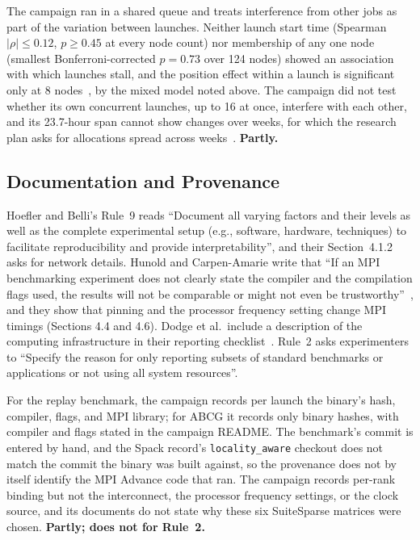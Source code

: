 \documentclass[11pt]{article}
\newcommand{\verdict}[1]{\textbf{#1}}
\begin{document}
The campaign ran in a shared queue and treats interference from other jobs as part of the
variation between launches. Neither launch start time (Spearman $|\rho| \le 0.12$,
$p \ge 0.45$ at every node count) nor membership of any one node (smallest
Bonferroni-corrected $p = 0.73$ over 124 nodes) showed an association with which launches
stall, and the position effect within a launch is significant only at 8
nodes~\cite{fivewayreport}, by the mixed model noted above. The campaign did not test
whether its own concurrent launches, up to 16 at once, interfere with each other, and its
23.7-hour span cannot show changes over weeks, for which the research plan asks for
allocations spread across weeks~\cite{researchplan}. \verdict{Partly.}

\subsection{Documentation and Provenance}

Hoefler and Belli's Rule~9 reads ``Document all varying factors and their levels as well
as the complete experimental setup (e.g., software, hardware, techniques) to facilitate
reproducibility and provide interpretability'', and their Section~4.1.2 asks for network
details. Hunold and Carpen-Amarie write that ``If an MPI benchmarking experiment does not
clearly state the compiler and the compilation flags used, the results will not be
comparable or might not even be trustworthy''~\cite[Section~4.5]{hunold2016reproducible},
and they show that pinning and the processor frequency setting change MPI timings
(Sections 4.4 and 4.6). Dodge et al.\ include a description of the computing
infrastructure in their reporting checklist~\cite{dodge2019show}. Rule~2 asks
experimenters to ``Specify the reason for only reporting subsets of standard benchmarks
or applications or not using all system resources''.

For the replay benchmark, the campaign records per launch the binary's hash, compiler,
flags, and MPI library; for ABCG it records only binary hashes, with compiler and flags
stated in the campaign README. The benchmark's commit is entered by hand, and the Spack
record's \texttt{locality\_aware} checkout does not match the commit the binary was built
against, so the provenance does not by itself identify the MPI Advance code that ran. The
campaign records per-rank binding but not the interconnect, the processor frequency
settings, or the clock source, and its documents do not state why these six SuiteSparse
matrices were chosen. \verdict{Partly; does not for Rule~2.}
\end{document}
